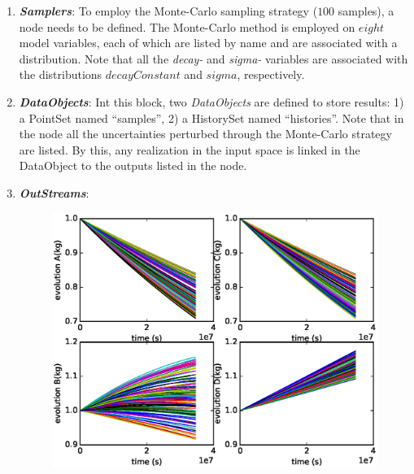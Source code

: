 \begin{enumerate}
   \item \textbf{\textit{Samplers}}:
      To employ the Monte-Carlo sampling strategy ($100$ samples), a
       node needs to be defined.  The
      Monte-Carlo method is employed on $eight$ model variables, each of which are listed by name
      and are associated with a distribution.
      Note that all the \textit{decay-\*} and
      \textit{sigma-\*} variables are associated with the distributions
      $decayConstant$ and $sigma$, respectively.
   \item \textbf{\textit{DataObjects}}:
      Int this block, two \textit{DataObjects} are defined to store results: 1) a PointSet named
      ``samples'', 2) a HistorySet named ``histories''.
      Note that in the  node all the uncertainties
      perturbed through the Monte-Carlo strategy are listed. By this, any
      realization in the input space is linked in the DataObject to the outputs listed in the
       node.
   \item \textbf{\textit{OutStreams}}:
 \begin{figure}[h!]
  \centering
  \includegraphics[scale=0.7]{../../tests/framework/user_guide/ForwardSamplingStrategies/gold/RunDir/MonteCarlo/1-historyPlot_line-line-line-line.eps}

\end{figure}
\end{enumerate}
